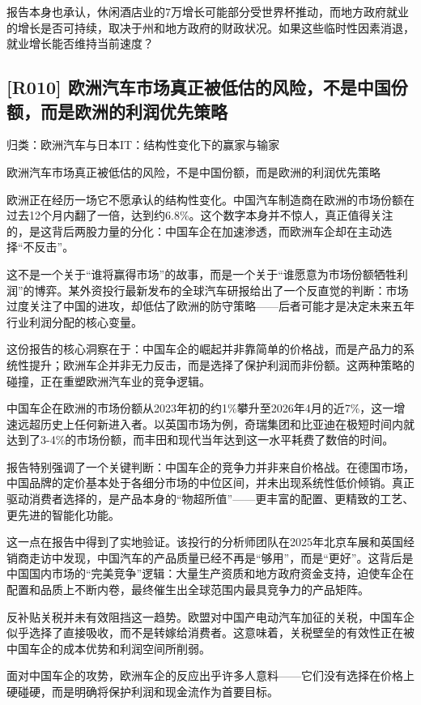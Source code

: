 \documentclass[11pt]{ctexart}
\begin{document}
报告本身也承认，休闲酒店业的7万增长可能部分受世界杯推动，而地方政府就业的增长是否可持续，取决于州和地方政府的财政状况。如果这些临时性因素消退，就业增长能否维持当前速度？

\subsection{[R010] 欧洲汽车市场真正被低估的风险，不是中国份额，而是欧洲的利润优先策略}
{\small\color{refgray}归类：欧洲汽车与日本IT：结构性变化下的赢家与输家}

欧洲汽车市场真正被低估的风险，不是中国份额，而是欧洲的利润优先策略

欧洲正在经历一场它不愿承认的结构性变化。中国汽车制造商在欧洲的市场份额在过去12个月内翻了一倍，达到约6.8\%。这个数字本身并不惊人，真正值得关注的，是这背后两股力量的分化：中国车企在加速渗透，而欧洲车企却在主动选择“不反击”。

这不是一个关于“谁将赢得市场”的故事，而是一个关于“谁愿意为市场份额牺牲利润”的博弈。某外资投行最新发布的全球汽车研报给出了一个反直觉的判断：市场过度关注了中国的进攻，却低估了欧洲的防守策略——后者可能才是决定未来五年行业利润分配的核心变量。

这份报告的核心洞察在于：中国车企的崛起并非靠简单的价格战，而是产品力的系统性提升；欧洲车企并非无力反击，而是选择了保护利润而非份额。这两种策略的碰撞，正在重塑欧洲汽车业的竞争逻辑。

中国车企在欧洲的市场份额从2023年初的约1\%攀升至2026年4月的近7\%，这一增速远超历史上任何新进入者。以英国市场为例，奇瑞集团和比亚迪在极短时间内就达到了3-4\%的市场份额，而丰田和现代当年达到这一水平耗费了数倍的时间。

报告特别强调了一个关键判断：中国车企的竞争力并非来自价格战。在德国市场，中国品牌的定价基本处于各细分市场的中位区间，并未出现系统性低价倾销。真正驱动消费者选择的，是产品本身的“物超所值”——更丰富的配置、更精致的工艺、更先进的智能化功能。

这一点在报告中得到了实地验证。该投行的分析师团队在2025年北京车展和英国经销商走访中发现，中国汽车的产品质量已经不再是“够用”，而是“更好”。这背后是中国国内市场的“完美竞争”逻辑：大量生产资质和地方政府资金支持，迫使车企在配置和品质上不断内卷，最终催生出全球范围内最具竞争力的产品矩阵。

反补贴关税并未有效阻挡这一趋势。欧盟对中国产电动汽车加征的关税，中国车企似乎选择了直接吸收，而不是转嫁给消费者。这意味着，关税壁垒的有效性正在被中国车企的成本优势和利润空间所削弱。

面对中国车企的攻势，欧洲车企的反应出乎许多人意料——它们没有选择在价格上硬碰硬，而是明确将保护利润和现金流作为首要目标。
\end{document}
